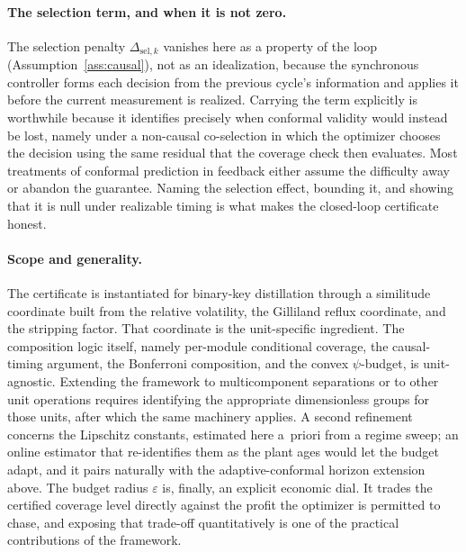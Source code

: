 \paragraph{The selection term, and when it is not zero.}
The selection penalty $\Delta_{\mathrm{sel},k}$ vanishes here as a property of the loop
(Assumption~\ref{ass:causal}), not as an idealization, because the synchronous controller
forms each decision from the previous cycle's information and applies it before the
current measurement is realized. Carrying the term explicitly is worthwhile because it
identifies precisely when conformal validity would instead be lost, namely under a
non-causal co-selection in which the optimizer chooses the decision using the same
residual that the coverage check then evaluates. Most treatments of conformal prediction
in feedback either assume the difficulty away or abandon the guarantee. Naming the
selection effect, bounding it, and showing that it is null under realizable timing is what
makes the closed-loop certificate honest.

\paragraph{Scope and generality.}
The certificate is instantiated for binary-key distillation through a similitude
coordinate built from the relative volatility, the Gilliland reflux coordinate, and the
stripping factor. That coordinate is the unit-specific ingredient. The composition logic
itself, namely per-module conditional coverage, the causal-timing argument, the Bonferroni
composition, and the convex $\psi$-budget, is unit-agnostic. Extending the framework to
multicomponent separations or to other unit operations requires identifying the
appropriate dimensionless groups for those units, after which the same machinery applies.
A second refinement concerns the Lipschitz constants, estimated here a~priori from a
regime sweep; an online estimator that re-identifies them as the plant ages would let the
budget adapt, and it pairs naturally with the adaptive-conformal horizon extension above.
The budget radius $\varepsilon$ is, finally, an explicit economic dial. It trades the
certified coverage level directly against the profit the optimizer is permitted to chase,
and exposing that trade-off quantitatively is one of the practical contributions of the
framework.
